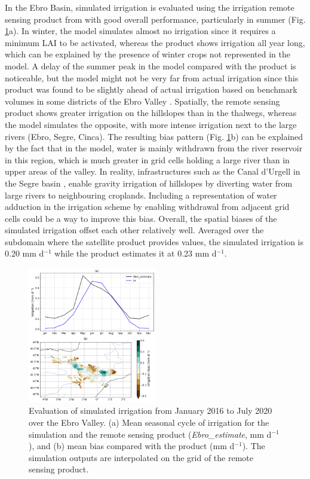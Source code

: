 In the Ebro Basin, simulated irrigation is evaluated using the irrigation remote sensing product from \cite{dari_regional_2023} with good overall performance, particularly in summer (Fig. \ref{fig:irrig_eval}a).
In winter, the model simulates almost no irrigation since it requires a minimum LAI to be activated, whereas the product shows irrigation all year long, which can be explained by the presence of winter crops not represented in the model.
A delay of the summer peak in the model compared with the product is noticeable, but the model might not be very far from actual irrigation since this product was found to be slightly ahead of actual irrigation based on benchmark volumes in some districts of the Ebro Valley \citep[Fig. 5 in ][]{dari_regional_2023}.
Spatially, the remote sensing product shows greater irrigation on the hillslopes than in the thalwegs, whereas the model simulates the opposite, with more intense irrigation next to the large rivers (Ebro, Segre, Cinca).
The resulting bias pattern (Fig. \ref{fig:irrig_eval}b) can be explained by the fact that in the model, water is mainly withdrawn from the river reservoir in this region, which is much greater in grid cells holding a large river than in upper areas of the valley. In reality, infrastructures such as the Canal d'Urgell in the Segre basin \citep{farran_urgell_2024}, enable gravity irrigation of hillslopes by diverting water from large rivers to neighbouring croplands. Including a representation of water adduction in the irrigation scheme by enabling withdrawal from adjacent grid cells could be a way to improve this bias.
Overall, the spatial biases of the simulated irrigation offset each other relatively well. Averaged over the subdomain where the satellite product provides values, the simulated irrigation is 0.20 mm d$^{-1}$ while the product estimates it at 0.23 mm d$^{-1}$.

\begin{figure}[htbp]
    \centering
    \includegraphics[width=0.5\textwidth]{images/chap4/article/f04.png}
    \caption{Evaluation of simulated irrigation from January 2016 to July 2020 over the Ebro Valley. (a) Mean seasonal cycle of irrigation for the \irr simulation and the remote sensing product (\textit{Ebro\_estimate}, mm d$^{-1}$), and (b) mean bias compared with the product (mm d$^{-1}$). The simulation outputs are interpolated on the grid of the remote sensing product.}
    \label{fig:irrig_eval}
\end{figure}

